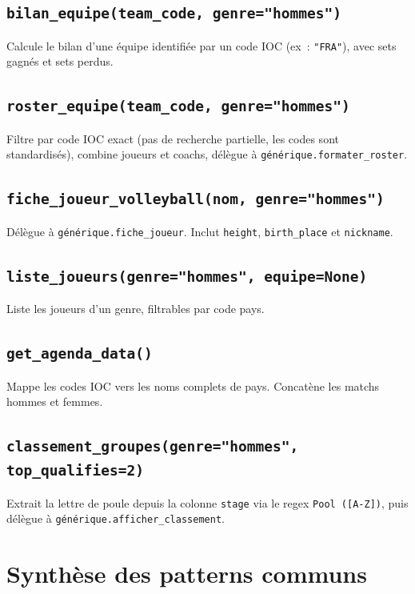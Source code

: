 \documentclass[12pt,a4paper]{article}
\begin{document}
\subsection{\texttt{bilan\_equipe(team\_code, genre="hommes")}}
Calcule le bilan d'une équipe identifiée par un code IOC (ex~: \texttt{"FRA"}),
avec sets gagnés et sets perdus.

\subsection{\texttt{roster\_equipe(team\_code, genre="hommes")}}
Filtre par code IOC exact (pas de recherche partielle, les codes sont
standardisés), combine joueurs et coachs, délègue à
\texttt{générique.formater\_roster}.

\subsection{\texttt{fiche\_joueur\_volleyball(nom, genre="hommes")}}
Délègue à \texttt{générique.fiche\_joueur}. Inclut \texttt{height},
\texttt{birth\_place} et \texttt{nickname}.

\subsection{\texttt{liste\_joueurs(genre="hommes", equipe=None)}}
Liste les joueurs d'un genre, filtrables par code pays.

\subsection{\texttt{get\_agenda\_data()}}
Mappe les codes IOC vers les noms complets de pays. Concatène les matchs
hommes et femmes.

\subsection{\texttt{classement\_groupes(genre="hommes", top\_qualifies=2)}}
Extrait la lettre de poule depuis la colonne \texttt{stage} via le regex
\texttt{Pool ([A-Z])}, puis délègue à \texttt{générique.afficher\_classement}.

\section{Synthèse des patterns communs}
\end{document}
